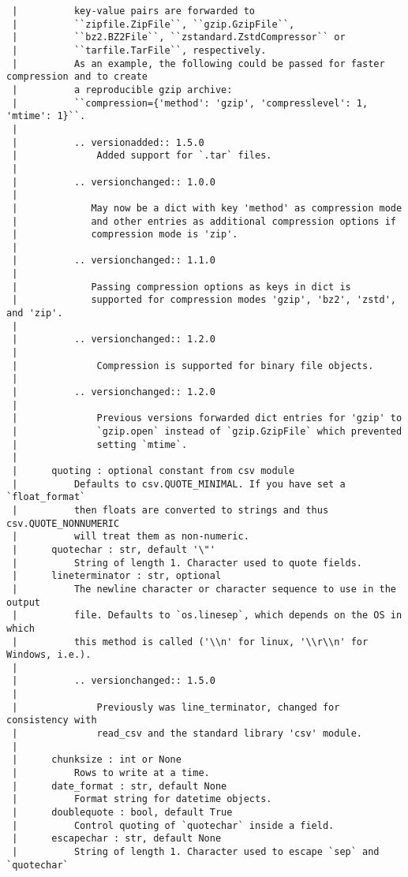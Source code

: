 \documentclass[
  letterpaper,
  DIV=11,
  numbers=noendperiod]{scrreprt}
\begin{document}
\begin{verbatim}
 |          key-value pairs are forwarded to
 |          ``zipfile.ZipFile``, ``gzip.GzipFile``,
 |          ``bz2.BZ2File``, ``zstandard.ZstdCompressor`` or
 |          ``tarfile.TarFile``, respectively.
 |          As an example, the following could be passed for faster compression and to create
 |          a reproducible gzip archive:
 |          ``compression={'method': 'gzip', 'compresslevel': 1, 'mtime': 1}``.
 |      
 |          .. versionadded:: 1.5.0
 |              Added support for `.tar` files.
 |      
 |          .. versionchanged:: 1.0.0
 |      
 |             May now be a dict with key 'method' as compression mode
 |             and other entries as additional compression options if
 |             compression mode is 'zip'.
 |      
 |          .. versionchanged:: 1.1.0
 |      
 |             Passing compression options as keys in dict is
 |             supported for compression modes 'gzip', 'bz2', 'zstd', and 'zip'.
 |      
 |          .. versionchanged:: 1.2.0
 |      
 |              Compression is supported for binary file objects.
 |      
 |          .. versionchanged:: 1.2.0
 |      
 |              Previous versions forwarded dict entries for 'gzip' to
 |              `gzip.open` instead of `gzip.GzipFile` which prevented
 |              setting `mtime`.
 |      
 |      quoting : optional constant from csv module
 |          Defaults to csv.QUOTE_MINIMAL. If you have set a `float_format`
 |          then floats are converted to strings and thus csv.QUOTE_NONNUMERIC
 |          will treat them as non-numeric.
 |      quotechar : str, default '\"'
 |          String of length 1. Character used to quote fields.
 |      lineterminator : str, optional
 |          The newline character or character sequence to use in the output
 |          file. Defaults to `os.linesep`, which depends on the OS in which
 |          this method is called ('\\n' for linux, '\\r\\n' for Windows, i.e.).
 |      
 |          .. versionchanged:: 1.5.0
 |      
 |              Previously was line_terminator, changed for consistency with
 |              read_csv and the standard library 'csv' module.
 |      
 |      chunksize : int or None
 |          Rows to write at a time.
 |      date_format : str, default None
 |          Format string for datetime objects.
 |      doublequote : bool, default True
 |          Control quoting of `quotechar` inside a field.
 |      escapechar : str, default None
 |          String of length 1. Character used to escape `sep` and `quotechar`

\end{verbatim}
\end{document}
